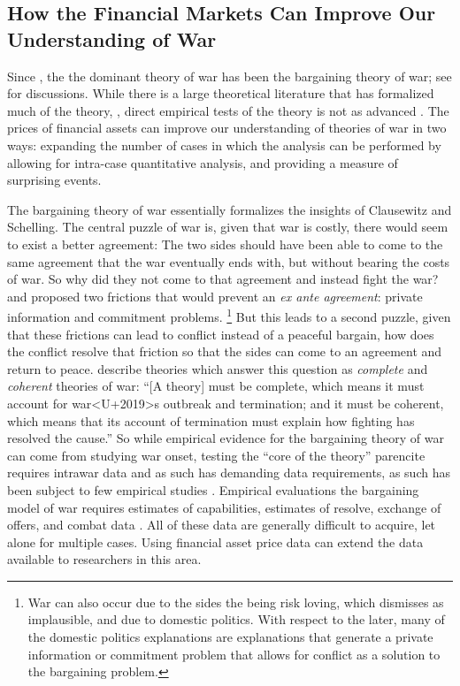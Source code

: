 \subsection{How the Financial Markets Can Improve Our Understanding of War}
\label{bonds_battles:sec:how-prices-financial-1}

Since \parencite{Fearon1995}, the the dominant theory of war has been the bargaining theory of war; see \textcites{Reiter2003}{Powell2006}{Reiter2009} for discussions.%
While there is a large theoretical literature that has formalized much of the theory, \parencites{FilsonWerner2002}{Slantchev2003}{SmithStam2004}{Powell2004}{LeventogluSlantchev2007}{LangloisLanglois2009}{WolfordReiterCarrubba2011}, direct empirical tests of the theory is not as advanced \parencite{Reiter2009}.
The prices of financial assets can improve our understanding of theories of war in two ways: expanding the number of cases in which the analysis can be performed by allowing for intra-case quantitative analysis, and providing a measure of surprising events.

The bargaining theory of war essentially formalizes the insights of Clausewitz and Schelling.
The central puzzle of war is, given that war is costly, there would seem to exist a better agreement:
The two sides should have been able to come to the same agreement that the war eventually ends with, but without bearing the costs of war.
So why did they not come to that agreement and instead fight the war? 
\parencite{Fearon1995} and \parencite{Powell2006} proposed two frictions that would prevent an \textit{ex ante agreement}: private information and commitment problems.%
\footnote{
  War can also occur due to the sides the being risk loving, which \textcite{Fearon1995} dismisses as implausible, and due to domestic politics.
  With respect to the later, many of the domestic politics explanations are explanations that generate a private information or commitment problem that allows for conflict as a solution to the bargaining problem.
}
But this leads to a second puzzle, given that these frictions can lead to conflict instead of a peaceful bargain, how does the conflict resolve that friction so that the sides can come to an agreement and return to peace.
\textcite[757]{LeventogluSlantchev2007} describe theories which answer this question as \textit{complete} and \textit{coherent} theories of war: ``[A theory] must be complete, which means it must account for war<U+2019>s outbreak and termination; and it must be coherent, which means that its account of termination must explain how fighting has resolved the cause.''
So while empirical evidence for the bargaining theory of war can come from studying war onset, testing the ``core of the theory'' parencite requires intrawar data and as such has demanding data requirements, as such has been subject to few empirical studies \parencites{Reiter2003}{Ramsay2008}{Reiter2009}{Weisiger2015}.
Empirical evaluations the bargaining model of war requires estimates of capabilities, estimates of resolve, exchange of offers, and combat data \parencite{Reiter2003}.
All of these data are generally difficult to acquire, let alone for multiple cases. 
Using financial asset price data can extend the data available to researchers in this area.

